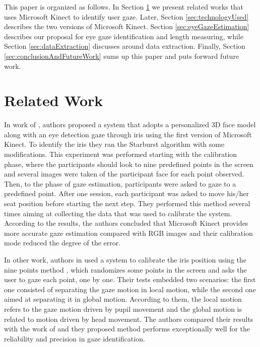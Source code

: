 \documentclass[10pt, conference]{IEEEtran}
\begin{document}
	This paper is organized as follows.
	In Section \ref{sec:relatedWork} we present related works that uses Microsoft Kinect to identify user gaze.
	Later, Section \ref{sec:technologyUsed} describes the two versions of Microsoft Kinect.
	Section \ref{sec:eyeGazeEstimation} describes our proposal for eye gaze identification and length measuring, while Section \ref{sec:dataExtraction} discusses around data extraction.
	Finally, Section \ref{sec:conclusionAndFutureWork} sums up this paper and puts forward future work.

\section{Related Work} \label{sec:relatedWork}

	In work of \cite{7}, authors proposed a system that adopts a personalized 3D face model along with an eye detection gaze through iris using the first version of Microsoft Kinect. 
	To identify the iris they ran the Starburst algorithm \cite{8} with some modifications. 
	This experiment was performed starting with the calibration phase, where the participants should look to nine predefined points in the screen and several images were taken of the participant face for each point observed. 
	Then, to the phase of gaze estimation, participants were asked to gaze to a predefined point. 
	After one session, each participant was asked to move his/her seat position before starting the next step. 
	They performed this method several times aiming at collecting the data that was used to calibrate the system.
	According to the results, the authors concluded that Microsoft Kinect provides more accurate gaze estimation compared with RGB images and their calibration mode reduced the degree of the error.

	In other work, authors in \cite{8} used a system to calibrate the iris position using the nine points method \cite{9}, which randomizes some points in the screen and asks the user to gaze each point, one by one. 
	Their tests embedded two scenarios: the first one consisted of separating the gaze motion in local motion, while the second one aimed at separating it in global motion. 
	According to them, the local motion refers to the gaze motion driven by pupil movement and the global motion is related to motion driven by head movement. 
	The authors compared their results with the work of \cite{9}  and they proposed method performs exceptionally well for the reliability and precision in gaze identification.
\end{document}

